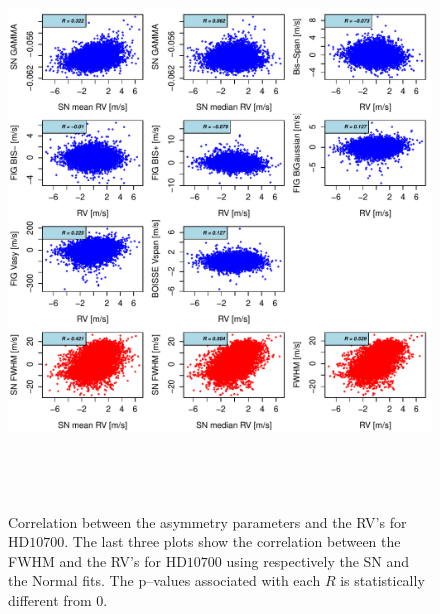 \documentclass[11pt, oneside]{article}
\begin{document}
\begin{figure}[htbp]
   \centering
\includegraphics[height = 6in]{HD10700_[4]Comparison_para.pdf}  
   \caption{Correlation between the asymmetry parameters and the RV's for $\text{HD}10700$. The last three plots show the correlation between the FWHM and the RV's for $\text{HD}10700$ using respectively the SN and the Normal fits. The p--values associated with each $R$ is statistically different from $0$.}
   \label{fig:Tau:corrPlot}
\end{figure}
\end{document}
